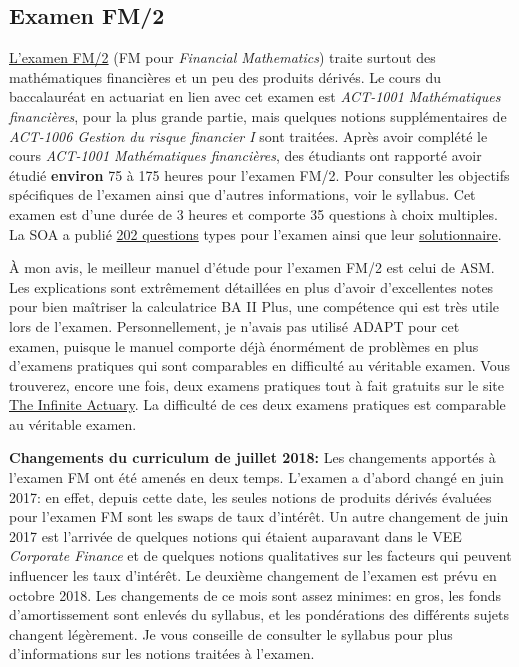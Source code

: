 \subsection*{Examen FM/2}
\label{subsec:examfm}
\href{https://www.soa.org/education/exam-req/edu-exam-fm-detail.aspx}{L'examen FM/2} (FM pour \textit{Financial Mathematics}) traite surtout des mathématiques financières et un peu des produits dérivés. Le cours du baccalauréat en actuariat en lien avec cet examen est \textit{ACT-1001 Mathématiques financières}, pour la plus grande partie, mais quelques notions supplémentaires de \textit{ACT-1006 Gestion du risque financier I} sont traitées. Après avoir complété le cours \textit{ACT-1001 Mathématiques financières}, des étudiants ont rapporté avoir étudié \textbf{environ} 75 à 175 heures pour l'examen FM/2. Pour consulter les objectifs spécifiques de l'examen ainsi que d'autres informations, voir le syllabus. Cet examen est d'une durée de 3 heures et comporte 35 questions à choix multiples. La SOA a publié \href{http://www.soa.org/Files/Edu/2017/exam-fm-sample-questions.pdf}{202 questions} types pour l'examen ainsi que leur \href{http://www.soa.org/Files/Edu/2017/exam-fm-sample-solutions.pdf}{solutionnaire}.\vspace{\baselineskip} 

À mon avis, le meilleur manuel d'étude pour l'examen FM/2 est celui de ASM. Les explications sont extrêmement détaillées en plus d'avoir d'excellentes notes pour bien maîtriser la calculatrice BA II Plus, une compétence qui est très utile lors de l'examen. Personnellement, je n'avais pas utilisé ADAPT pour cet examen, puisque le manuel comporte déjà énormément de problèmes en plus d'examens pratiques qui sont comparables en difficulté au véritable examen. Vous trouverez, encore une fois, deux examens pratiques tout à fait gratuits sur le site \href{http://www.theinfiniteactuary.com/exams/2}{The Infinite Actuary}. La difficulté de ces deux examens pratiques est comparable au véritable examen.\vspace{\baselineskip} 

\textbf{Changements du curriculum de juillet 2018:} Les changements apportés à l'examen FM ont été amenés en deux temps. L'examen a d'abord changé en juin 2017: en effet, depuis cette date, les seules notions de produits dérivés évaluées pour l'examen FM sont les swaps de taux d'intérêt. Un autre changement de juin 2017 est l'arrivée de quelques notions qui étaient auparavant dans le VEE \textit{Corporate Finance} et de quelques notions qualitatives sur les facteurs qui peuvent influencer les taux d'intérêt. Le deuxième changement de l'examen est prévu en octobre 2018. Les changements de ce mois sont assez minimes: en gros, les fonds d'amortissement sont enlevés du syllabus, et les pondérations des différents sujets changent légèrement. Je vous conseille de consulter le syllabus pour plus d'informations sur les notions traitées à l'examen.


